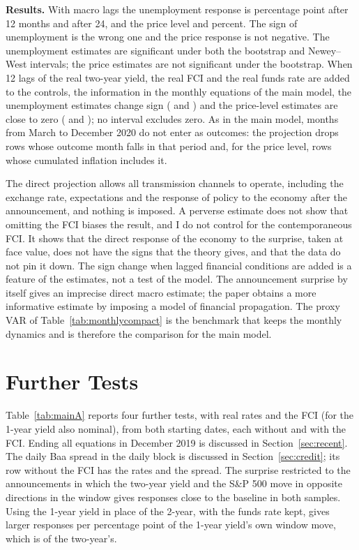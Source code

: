 \documentclass[11pt]{article}
\begin{document}
\begin{appendices}
\textbf{Results.} With macro lags the unemployment response is  percentage point after 12 months and  after 24, and the price level  and  percent. The sign of unemployment is the wrong one and the price response is not negative. The unemployment estimates are significant under both the bootstrap and Newey--West intervals; the price estimates are not significant under the bootstrap. When 12 lags of the real two-year yield, the real FCI and the real funds rate are added to the controls, the information in the monthly equations of the main model, the unemployment estimates change sign ( and ) and the price-level estimates are close to zero ( and ); no interval excludes zero. As in the main model, months from March to December 2020 do not enter as outcomes: the projection drops rows whose outcome month falls in that period and, for the price level, rows whose cumulated inflation includes it.

The direct projection allows all transmission channels to operate, including the exchange rate, expectations and the response of policy to the economy after the announcement, and nothing is imposed. A perverse estimate does not show that omitting the FCI biases the result, and I do not control for the contemporaneous FCI. It shows that the direct response of the economy to the surprise, taken at face value, does not have the signs that the theory gives, and that the data do not pin it down. The sign change when lagged financial conditions are added is a feature of the estimates, not a test of the model. The announcement surprise by itself gives an imprecise direct macro estimate; the paper obtains a more informative estimate by imposing a model of financial propagation. The proxy VAR of Table~\ref{tab:monthlycompact} is the benchmark that keeps the monthly dynamics and is therefore the comparison for the main model.



\FloatBarrier
\section{Further Tests}\label{app:further}
Table~\ref{tab:mainA} reports four further tests, with real rates and the FCI (for the 1-year yield also nominal), from both starting dates, each without and with the FCI. Ending all equations in December 2019 is discussed in Section~\ref{sec:recent}. The daily Baa spread in the daily block is discussed in Section~\ref{sec:credit}; its row without the FCI has the rates and the spread. The surprise restricted to the  announcements in which the two-year yield and the S\&P 500 move in opposite directions in the window \citep{jarocinski2020} gives responses close to the baseline in both samples. Using the 1-year yield in place of the 2-year, with the funds rate kept, gives larger responses per percentage point of the 1-year yield's own window move, which is  of the two-year's.


\end{appendices}
\end{document}
